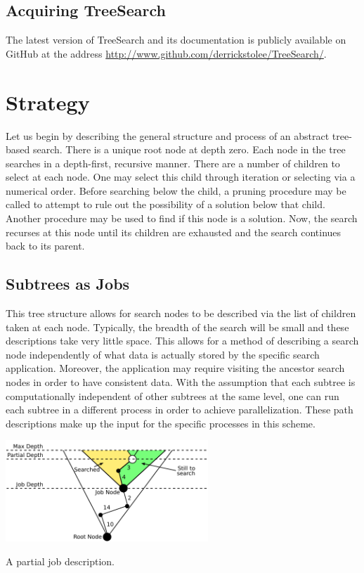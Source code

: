 \documentclass[11pt]{article}
\def\TreeSearch{{TreeSearch}}
\begin{document}
\subsection{Acquiring \TreeSearch}

The latest version of {\TreeSearch} and its documentation
	is publicly available on GitHub \cite{github} at the address
	\href{http://www.github.com/derrickstolee/TreeSearch/}{http://www.github.com/derrickstolee/TreeSearch/}.


\section{Strategy}
\label{sec:Strategy}

Let us begin by describing the general structure and process of an abstract
	tree-based search.
There is a unique root node at depth zero.
Each node in the tree searches in a depth-first, recursive manner.
There are a number of children to select at each node.
One may select this child through iteration or selecting via a numerical order.
Before searching below the child, a pruning procedure may be called to attempt to 
	rule out the possibility of a solution below that child.
Another procedure may be used to find if this node is a solution.
Now, the search recurses at this node until its children are exhausted 
	and the search continues back to its parent.

\subsection{Subtrees as Jobs}

This tree structure allows for search nodes to be described via the 
	list of children taken at each node.
Typically, the breadth of the search will be small and these descriptions take very little space.
This allows for a method of describing a search node independently of 
	what data is actually stored by the specific search application.
Moreover, the application may require visiting the ancestor search nodes in order
	to have consistent data.
With the assumption that each subtree is computationally independent of other subtrees at the same level,
	one can run each subtree in a different process in order to achieve parallelization.
These path descriptions make up the input for the specific processes in this scheme.

\begin{floatingfigure}{3in}\centering
	\includegraphics[width=3in]{figures/Jobs.pdf}
	\caption{\label{fig:jobs}A partial job description.}
\end{floatingfigure}
\end{document}
